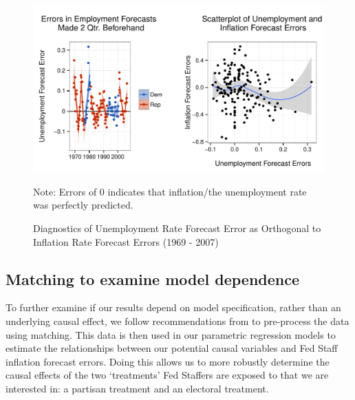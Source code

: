 \documentclass[a4paper]{article}\usepackage[]{graphicx}\usepackage[]{color}
\newenvironment{knitrout}{}{} %
\begin{document}
\begin{figure}[t]
    \caption{Diagnostics of Unemployment Rate Forecast Error as Orthogonal to Inflation Rate Forecast Errors (1969 - 2007)}
    \label{Unemployment}
    \begin{center}
    
\begin{knitrout}
\color{fgcolor}

{\centering \includegraphics[width=0.95\linewidth]{figure/GraphPartisanErrorUnemploy} 

}



\end{knitrout}


    \end{center}
    \begin{singlespace}
        {\scriptsize{Note: Errors of 0 indicates that inflation/the unemployment rate was perfectly predicted.}}
    \end{singlespace}
\end{figure}

\subsection*{Matching to examine model dependence}

To further examine if our results depend on model specification, rather than an underlying causal effect, we follow recommendations from \cite{Ho2007} to pre-process the data using matching. This data is then used in our parametric regression models to estimate the relationships between our potential causal variables and Fed Staff inflation forecast errors. Doing this allows us to more robustly determine the causal effects of the two `treatments' Fed Staffers are exposed to that we are interested in: a partisan treatment and an electoral treatment. 
\end{document}
